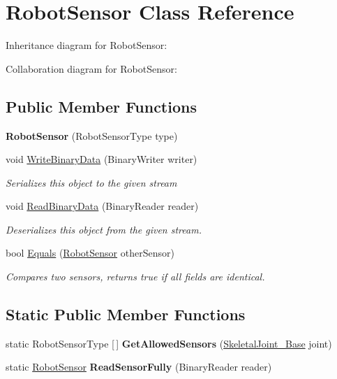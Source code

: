 \hypertarget{class_robot_sensor}{}\section{Robot\+Sensor Class Reference}
\label{class_robot_sensor}


Inheritance diagram for Robot\+Sensor\+:


Collaboration diagram for Robot\+Sensor\+:
\subsection*{Public Member Functions}
\begin{DoxyCompactItemize}
\item 
\mbox{\label{class_robot_sensor_a4685c35df7ea0bb8deabc3eaa001f06c}} 
{\bfseries Robot\+Sensor} (Robot\+Sensor\+Type type)
\item 
void \hyperlink{class_robot_sensor_aa1dc17e6028128cabb1ddbfdb1334b84}{Write\+Binary\+Data} (Binary\+Writer writer)
\begin{DoxyCompactList}\small\item\em Serializes this object to the given stream \end{DoxyCompactList}\item 
void \hyperlink{class_robot_sensor_ad847a256a5f297a3d4b1570a3ccbd97a}{Read\+Binary\+Data} (Binary\+Reader reader)
\begin{DoxyCompactList}\small\item\em Deserializes this object from the given stream. \end{DoxyCompactList}\item 
bool \hyperlink{class_robot_sensor_ad72161168e60cb70a19014de7d49ebc6}{Equals} (\hyperlink{class_robot_sensor}{Robot\+Sensor} other\+Sensor)
\begin{DoxyCompactList}\small\item\em Compares two sensors, returns true if all fields are identical. \end{DoxyCompactList}\end{DoxyCompactItemize}
\subsection*{Static Public Member Functions}
\begin{DoxyCompactItemize}
\item 
\mbox{\label{class_robot_sensor_ae52c7f875ebbad333a4d412c38279cfa}} 
static Robot\+Sensor\+Type \mbox{[}$\,$\mbox{]} {\bfseries Get\+Allowed\+Sensors} (\hyperlink{class_skeletal_joint___base}{Skeletal\+Joint\+\_\+\+Base} joint)
\item 
\mbox{\label{class_robot_sensor_a16dd86f41101b3eda4c5a4ac94bb4b3d}} 
static \hyperlink{class_robot_sensor}{Robot\+Sensor} {\bfseries Read\+Sensor\+Fully} (Binary\+Reader reader)
\end{DoxyCompactItemize}
